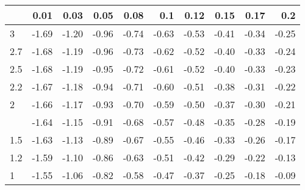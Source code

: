 
\begin{tabular}{lrrrrrrrrr}
\toprule
  & 0.01 & 0.03 & 0.05 & 0.08 & 0.1 & 0.12 & 0.15 & 0.17 & 0.2\\
\midrule
3 & -1.69 & -1.20 & -0.96 & -0.74 & -0.63 & -0.53 & -0.41 & -0.34 & -0.25\\
2.7 & -1.68 & -1.19 & -0.96 & -0.73 & -0.62 & -0.52 & -0.40 & -0.33 & -0.24\\
2.5 & -1.68 & -1.19 & -0.95 & -0.72 & -0.61 & -0.52 & -0.40 & -0.33 & -0.23\\
2.2 & -1.67 & -1.18 & -0.94 & -0.71 & -0.60 & -0.51 & -0.38 & -0.31 & -0.22\\
2 & -1.66 & -1.17 & -0.93 & -0.70 & -0.59 & -0.50 & -0.37 & -0.30 & -0.21\\
\addlinespace
1.7 & -1.64 & -1.15 & -0.91 & -0.68 & -0.57 & -0.48 & -0.35 & -0.28 & -0.19\\
1.5 & -1.63 & -1.13 & -0.89 & -0.67 & -0.55 & -0.46 & -0.33 & -0.26 & -0.17\\
1.2 & -1.59 & -1.10 & -0.86 & -0.63 & -0.51 & -0.42 & -0.29 & -0.22 & -0.13\\
1 & -1.55 & -1.06 & -0.82 & -0.58 & -0.47 & -0.37 & -0.25 & -0.18 & -0.09\\
\bottomrule
\end{tabular}
